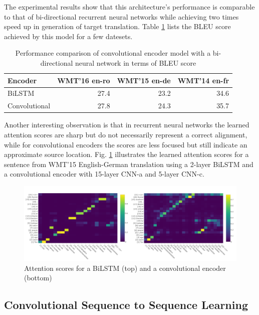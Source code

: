 \documentclass[a4paper]{article}
\begin{document}
The experimental results show that this architecture's performance is comparable
to that of bi-directional recurrent  neural networks while  achieving two  times
speed up in generation of target translation. Table \ref{tab:convseqblue}  lists
the BLEU score achieved by this model for a few datesets.


\begin{table}
  \center
  \begin{tabular}{lrrr}
  \hline
    Encoder & WMT'16 en-ro & WMT'15 en-de & WMT'14 en-fr \\
  \hline
    BiLSTM & 27.4 & 23.2 & 34.6 \\
    Convolutional & 27.8 & 24.3 & 35.7 \\
  \hline
  \end{tabular}
  \caption{Performance  comparison of  convolutional  encoder  model  with a bi-
  directional neural network in terms of BLEU score}
  \label{tab:convseqblue}
\end{table}


Another interesting observation is that in recurrent neural networks the learned
attention scores are sharp but do not necessarily represent a correct alignment,
while for convolutional encoders the  scores are less focused but still indicate
an approximate source  location.  Fig.  \ref{fig:atts}  illustrates  the learned
attention scores  for a  sentence from WMT'15 English-German translation using a
2-layer  BiLSTM  and  a convolutional  encoder with  15-layer CNN-a  and 5-layer
CNN-c.


\begin{figure}
  \center
  \includegraphics[width=\textwidth]{img/atts}
  \caption{Attention scores  for  a  BiLSTM  (top) and a  convolutional  encoder
  (bottom)}
  \label{fig:atts}
\end{figure}


\subsection{Convolutional Sequence to Sequence Learning}
\end{document}
